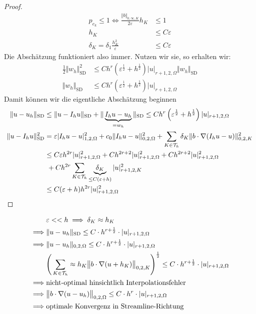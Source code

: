 \begin{proof}
\begin{align*}
		p_{e_k}\leq1\Longleftrightarrow\frac{\Vert b\Vert_{0,\infty,K}}{2\varepsilon}h_K&\leq 1\\
		h_K&\leq C\varepsilon\\
		\delta_K=\delta_1\frac{h_K^2}{\varepsilon}&\leq C\varepsilon
	\end{align*}
	Die Abschätzung funktioniert also immer. Nutzen wir sie, so erhalten wir:
	\begin{align*}
		\frac{1}{2}\Vert w_h\Vert^2_{\text{SD}}&\leq C h^r\left(\varepsilon^{\frac{1}{2}}+h^{\frac{1}{2}}\right)|u|_{r+1,2,\Omega}\Vert w_h\Vert_{\text{SD}}\\
		\Vert w_h\Vert_{\text{SD}}&\leq C h^r\left(\varepsilon^{\frac{1}{2}}+h^{\frac{1}{2}}\right)|u|_{r+1,2,\Omega}
	\end{align*}
	Damit können wir die eigentliche Abschätzung beginnen
	\begin{align*}
		\Vert u-u_h\Vert_{\text{SD}}
		&\leq\Vert u-I_h u\Vert_{\text{SD}}+\Vert\underbrace{I_h u-u_h}_{=w_h}\Vert_{\text{SD}}
		\leq Ch^r\left(\varepsilon^{\frac{1}{2}}+h^{\frac{1}{2}}\right)|u|_{r+1,2,\Omega}\\
		\Vert u-I_h u\Vert^2_{\text{SD}}
		&=\varepsilon|I_h u-u|^2_{1,2,\Omega}+c_0\Vert I_h u-u\Vert^2_{0,2,\Omega}+\sum\limits_{K\in\mathcal{T}_h}\delta_K\Vert b\cdot\nabla(I_h u-u)\Vert^2_{0,2,K}\\
		&\leq C\varepsilon h^{2r}|u|^2_{r+1,2,\Omega}+C h^{2r+2}|u|^2_{r+1,2,\Omega}+C h^{2r+2}|u|^2_{r+1,2,\Omega}\\
		&~+Ch^{2r}\sum\limits_{K\in\mathcal{T}_h}\underbrace{\delta_K}_{\leq C(\varepsilon+h)}|u|^2_{r+1,2,K}\\
		&\leq C(\varepsilon+h) h^{2r}|u|^2_{r+1,2,\Omega}
	\end{align*}
\end{proof}

\begin{align*}
	&\varepsilon<<h\implies \delta_K\approx h_K\\
	\implies&\Vert u-u_h\Vert_{\text{SD}}\leq C\cdot h^{r+\frac{1}{2}}\cdot|u|_{r+1,2,\Omega}\\
	\implies& \Vert u-u_h\Vert_{0,2,\Omega}\leq C\cdot h^{r+\frac{1}{2}}\cdot|u|_{r+1,2,\Omega}\\
	&\Bigg(\sum\limits_{K\in\mathcal{T}_h}\approx h_K\big\Vert b\cdot\nabla(u+h_K)\big\Vert_{0,2,K}\Bigg)^{\frac{1}{2}}
	\leq C\cdot h^{r+\frac{1}{2}}\cdot|u|_{r+1,2,\Omega}\\
	\implies&\text{nicht-optimal hinsichtlich Interpolationsfehler}\\
	\implies& \big\Vert b\cdot\nabla(u-u_h)\big\Vert_{0,2,\Omega}\leq C\cdot h^r\cdot|u|_{r+1,2,\Omega}\\
	\implies&\text{optimale Konvergenz in Streamline-Richtung}
\end{align*}

